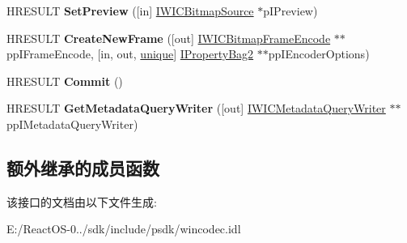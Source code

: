 \begin{DoxyCompactItemize}
\mbox{\label{interface_i_w_i_c_bitmap_encoder_abf4cb69b07eef55f1e44c2d6e780de0c}} 
H\+R\+E\+S\+U\+LT {\bfseries Set\+Preview} (\mbox{[}in\mbox{]} \hyperlink{interface_i_w_i_c_bitmap_source}{I\+W\+I\+C\+Bitmap\+Source} $\ast$p\+I\+Preview)
\item 
\mbox{\label{interface_i_w_i_c_bitmap_encoder_a975566524fa2dea50bf3eb30e589b907}} 
H\+R\+E\+S\+U\+LT {\bfseries Create\+New\+Frame} (\mbox{[}out\mbox{]} \hyperlink{interface_i_w_i_c_bitmap_frame_encode}{I\+W\+I\+C\+Bitmap\+Frame\+Encode} $\ast$$\ast$pp\+I\+Frame\+Encode, \mbox{[}in, out, \hyperlink{interfaceunique}{unique}\mbox{]} \hyperlink{interface_i_property_bag2}{I\+Property\+Bag2} $\ast$$\ast$pp\+I\+Encoder\+Options)
\item 
\mbox{\label{interface_i_w_i_c_bitmap_encoder_a18b786f343ed300252251af5ec50239c}} 
H\+R\+E\+S\+U\+LT {\bfseries Commit} ()
\item 
\mbox{\label{interface_i_w_i_c_bitmap_encoder_a5c520fbd109425f3100d85b7ba55ff7f}} 
H\+R\+E\+S\+U\+LT {\bfseries Get\+Metadata\+Query\+Writer} (\mbox{[}out\mbox{]} \hyperlink{interface_i_w_i_c_metadata_query_writer}{I\+W\+I\+C\+Metadata\+Query\+Writer} $\ast$$\ast$pp\+I\+Metadata\+Query\+Writer)
\end{DoxyCompactItemize}
\subsection*{额外继承的成员函数}


该接口的文档由以下文件生成\+:\begin{DoxyCompactItemize}
\item 
E\+:/\+React\+O\+S-\/0../sdk/include/psdk/wincodec.\+idl\end{DoxyCompactItemize}
